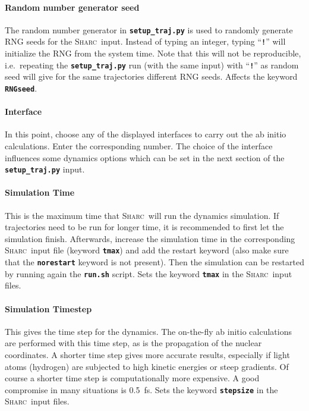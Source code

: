 \documentclass[a4paper,10pt,DIV=15,openany]{scrbook}
\newcommand{\sharc}{\textsc{Sharc}}
\newcommand{\ttt}[1]{\textbf{\texttt{#1}}}
\begin{document}
\paragraph{Random number generator seed}

The random number generator in \ttt{setup\_traj.py} is used to randomly generate RNG seeds for the \sharc\ input. Instead of typing an integer, typing ``\ttt{!}'' will initialize the RNG from the system time. Note that this will not be reproducible, i.e.\ repeating the \ttt{setup\_traj.py} run (with the same input) with ``\ttt{!}'' as random seed will give for the same trajectories different RNG seeds. Affects the keyword \ttt{RNGseed}.

\paragraph{Interface}

In this point, choose any of the displayed interfaces to carry out the ab initio calculations. Enter the corresponding number. The choice of the interface influences some dynamics options which can be set in the next section of the \ttt{setup\_traj.py} input.

\paragraph{Simulation Time}

This is the maximum time that \sharc\ will run the dynamics simulation. If trajectories need to be run for longer time, it is recommended to first let the simulation finish. Afterwards, increase the simulation time in the corresponding \sharc\ input file (keyword \ttt{tmax}) and add the restart keyword (also make sure that the \ttt{norestart} keyword is not present). Then the simulation can be restarted by running again the \ttt{run.sh} script. Sets the keyword \ttt{tmax} in the \sharc\ input files.

\paragraph{Simulation Timestep}

This gives the time step for the dynamics. The on-the-fly ab initio calculations are performed with this time step, as is the propagation of the nuclear coordinates. A shorter time step gives more accurate results, especially if light atoms (hydrogen) are subjected to high kinetic energies or steep gradients. Of course a shorter time step is computationally more expensive. A good compromise in many situations is 0.5~fs. Sets the keyword \ttt{stepsize} in the \sharc\ input files.
\end{document}

